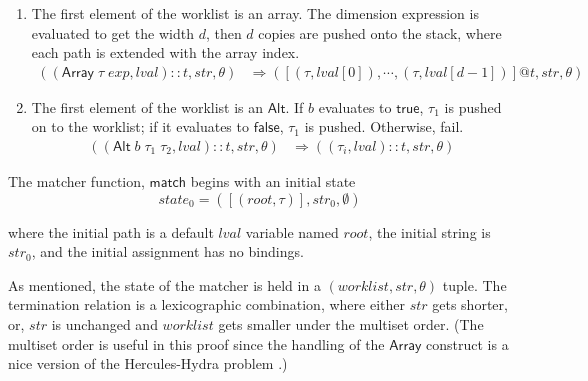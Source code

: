 \documentclass[a4paper,UKenglish,cleveref, autoref, thm-restate]{lipics-v2021}
\newcommand{\konst}[1]{\ensuremath{\mathsf{#1}}}
\newcommand{\lval}{\ensuremath{\mathit{lval}}}
\begin{document}
\begin{definition}
\begin{enumerate}
\item The first element of the worklist is an array. The dimension
  expression is evaluated to get the width $d$, then $d$ copies are
  pushed onto the stack, where each path is extended with the array
  index.
%
\begin{align*}
((\konst{Array}\; \tau \; \mathit{exp},\lval)::t, \mathit{str}, \theta)
   &\Rightarrow
  ([(\tau,\lval[0]), \cdots , (\tau,\lval[d-1])] @ t,\mathit{str}, \theta)
\end{align*}

\item The first element of the worklist is an \konst{Alt}. If $b$ evaluates to \konst{true},
  $\tau_1$ is pushed on to the worklist; if it evaluates to \konst{false}, $\tau_1$ is pushed.
  Otherwise, fail.
%
\begin{align*}
((\konst{Alt}\; b\;\tau_1\;\tau_2, \lval)::t, \mathit{str}, \theta)
   &\Rightarrow
  ((\tau_i,\lval)::t,\mathit{str}, \theta)
\end{align*}

\end{enumerate}

\noindent The matcher function, \konst{match} begins with an initial state
%
\[
  \mathit{state}_0 = ([(\mathit{root},\tau)],\mathit{str}_0,\emptyset)
\]

where the initial path is a default \lval{} variable named
$\mathit{root}$, the initial string is $\mathit{str}_0$, and the
initial assignment has no bindings.

\end{definition}

\begin{theorem}
As mentioned, the state of the matcher is held in a
$(\mathit{worklist},\mathit{str}, \theta)$ tuple. The termination
relation is a lexicographic combination, where either $\mathit{str}$
gets shorter, or, $\mathit{str}$ is unchanged and $\mathit{worklist}$
gets smaller under the multiset order. (The multiset order is useful
in this proof since the handling of the \konst{Array} construct is a
nice version of the Hercules-Hydra problem \cite{dershowitz:manna}.)
\end{theorem}
\end{document}
